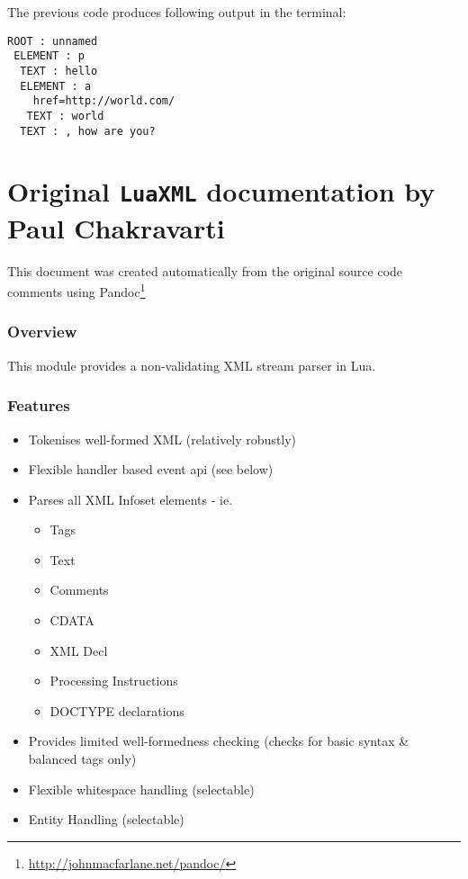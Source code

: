 \documentclass{ltxdoc}
\begin{document}
The previous code produces following output in the terminal: %

\begin{verbatim}
ROOT : unnamed
 ELEMENT : p
  TEXT : hello
  ELEMENT : a
    href=http://world.com/
   TEXT : world
  TEXT : , how are you?
\end{verbatim}



\clearpage
\part{Original \texttt{LuaXML} documentation by Paul Chakravarti}
\medskip

\noindent This document was created automatically from the original source code comments using Pandoc\footnote{\url{http://johnmacfarlane.net/pandoc/}} 

\section{Overview}


This module provides a non-validating XML stream parser in Lua. 
\section{Features}

\begin{itemize}
\item
  Tokenises well-formed XML (relatively robustly)
\item
  Flexible handler based event api (see below)
\item
  Parses all XML Infoset elements - ie.
  \begin{itemize}
  \item
    Tags
  \item
    Text
  \item
    Comments
  \item
    CDATA
  \item
    XML Decl
  \item
    Processing Instructions
  \item
    DOCTYPE declarations
  \end{itemize}
\item
  Provides limited well-formedness checking (checks for basic syntax \&
  balanced tags only)
\item
  Flexible whitespace handling (selectable)
\item
  Entity Handling (selectable)
\end{itemize}
\end{document}
